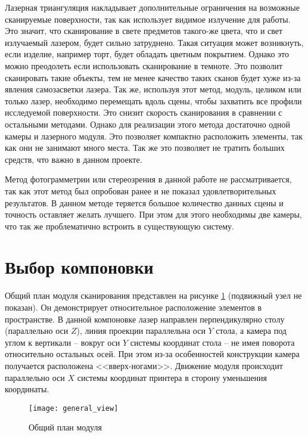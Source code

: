         Лазерная триангуляция накладывает дополнительные ограничения на возможные сканируемые поверхности, так как использует видимое излучение для работы. Это значит, что сканирование в свете предметов такого-же цвета, что и свет излучаемый лазером, будет сильно затруднено. Такая ситуация может возникнуть, если изделие, например торт, будет обладать цветным покрытием. Однако это можно преодолеть если использовать сканирование в темноте. Это позволит сканировать такие объекты, тем не менее качество таких сканов будет хуже из-за явления самозасветки лазера.
        Так же, используя этот метод, модуль, целиком или только лазер, необходимо перемещать вдоль сцены, чтобы захватить все профили исследуемой поверхности. Это снизит скорость сканирования в сравнении с остальными методами.
        Однако для реализации этого метода достаточно одной камеры и лазерного модуля. Это позволяет компактно расположить элементы, так как они не занимают много места. Так же это позволяет не тратить больших средств, что важно в данном проекте.

        Метод фотограмметрии или стереозрения в данной работе не рассматривается, так как этот метод был опробован ранее и не показал удовлетворительных результатов. В данном методе теряется большое количество данных сцены и точность оставляет желать лучшего. При этом для этого необходимы две камеры, что так же проблематично встроить в существующую систему.
        
    \section{Выбор компоновки}
        Общий план модуля сканирования представлен на рисунке \ref{pic:general_view} (подвижный узел не показан). Он демонстрирует относительное расположение элементов в пространстве. В данной компоновке лазер направлен перпендикулярно столу (параллельно оси $ Z $), линия проекции параллельна оси $ Y $ стола, а камера под углом к вертикали -- вокруг оси $ Y $ системы координат стола -- не имея поворота относительно остальных осей. При этом из-за особенностей конструкции камера получается расположена <<вверх-ногами>>. Движение модуля происходит параллельно оси $ X $ системы координат принтера в сторону уменьшения координаты.


        \begin{figure}[H]
            \centering
            \texttt{[image: general\_view]}
            \caption{Общий план модуля}
            \label{pic:general_view}
        \end{figure}

